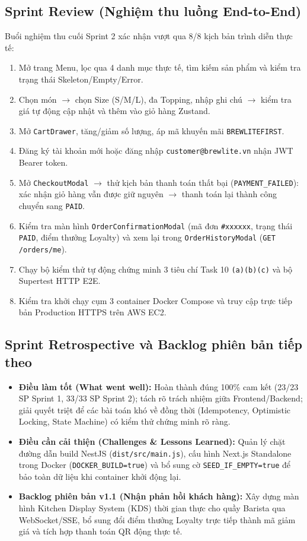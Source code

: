 \documentclass[a4paper,12pt]{article}
\begin{document}
\subsection{Sprint Review (Nghiệm thu luồng End-to-End)}
Buổi nghiệm thu cuối Sprint 2 xác nhận vượt qua 8/8 kịch bản trình diễn thực tế:
\begin{enumerate}[1.]
  \item Mở trang Menu, lọc qua 4 danh mục thực tế, tìm kiếm sản phẩm và kiểm tra trạng thái Skeleton/Empty/Error.
  \item Chọn món $\rightarrow$ chọn Size (S/M/L), đa Topping, nhập ghi chú $\rightarrow$ kiểm tra giá tự động cập nhật và thêm vào giỏ hàng Zustand.
  \item Mở \texttt{CartDrawer}, tăng/giảm số lượng, áp mã khuyến mãi \texttt{BREWLITEFIRST}.
  \item Đăng ký tài khoản mới hoặc đăng nhập \texttt{customer@brewlite.vn} nhận JWT Bearer token.
  \item Mở \texttt{CheckoutModal} $\rightarrow$ thử kịch bản thanh toán thất bại (\texttt{PAYMENT\_FAILED}): xác nhận giỏ hàng vẫn được giữ nguyên $\rightarrow$ thanh toán lại thành công chuyển sang \texttt{PAID}.
  \item Kiểm tra màn hình \texttt{OrderConfirmationModal} (mã đơn \texttt{\#xxxxxx}, trạng thái \texttt{PAID}, điểm thưởng Loyalty) và xem lại trong \texttt{OrderHistoryModal} (\texttt{GET /orders/me}).
  \item Chạy bộ kiểm thử tự động chứng minh 3 tiêu chí Task 10 \texttt{(a)(b)(c)} và bộ Supertest HTTP E2E.
  \item Kiểm tra khởi chạy cụm 3 container Docker Compose và truy cập trực tiếp bản Production HTTPS trên AWS EC2.
\end{enumerate}

\subsection{Sprint Retrospective và Backlog phiên bản tiếp theo}
\begin{itemize}
  \item \textbf{Điều làm tốt (What went well):} Hoàn thành đúng 100\% cam kết (23/23 SP Sprint 1, 33/33 SP Sprint 2); tách rõ trách nhiệm giữa Frontend/Backend; giải quyết triệt để các bài toán khó về đồng thời (Idempotency, Optimistic Locking, State Machine) có kiểm thử chứng minh rõ ràng.
  \item \textbf{Điều cần cải thiện (Challenges \& Lessons Learned):} Quản lý chặt đường dẫn build NestJS (\texttt{dist/src/main.js}), cấu hình Next.js Standalone trong Docker (\texttt{DOCKER\_BUILD=true}) và bổ sung cờ \texttt{SEED\_IF\_EMPTY=true} để bảo toàn dữ liệu khi container khởi động lại.
  \item \textbf{Backlog phiên bản v1.1 (Nhận phản hồi khách hàng):} Xây dựng màn hình Kitchen Display System (KDS) thời gian thực cho quầy Barista qua WebSocket/SSE, bổ sung đổi điểm thưởng Loyalty trực tiếp thành mã giảm giá và tích hợp thanh toán QR động thực tế.
\end{itemize}
\end{document}
